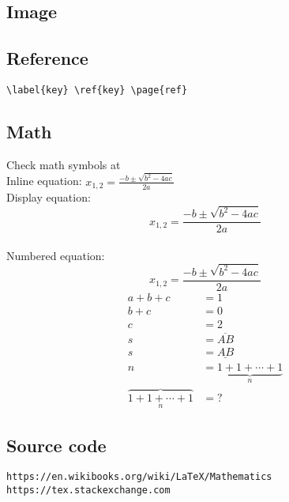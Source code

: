 \documentclass{article}
\newcommand{\site}[2][protocol]{\texttt{#1://#2}}
\begin{document}
\subsection{Image}
\subsection{Reference}
\verb|\label{key} \ref{key} \page{ref}|

\subsection{Math}
Check math symbols at \cite{R01}
\\Inline equation:
\( x_{1,2} = \frac{-b \pm \sqrt{b^2-4ac}}{2a} \)
\\Display equation:
\[ x_{1,2} = \frac{-b \pm \sqrt{b^2-4ac}}{2a} \]
\\Numbered equation:
\begin{equation}
x_{1,2} = \frac{-b \pm \sqrt{b^2-4ac}}{2a}
\end{equation}
\begin{align*}
  a + b + c &= 1\\
  b + c &= 0\\
  c &= 2\\
  s &= \overline{AB}\\
  s &= \underline{AB}\\
  n &= \underbrace{1+1+\cdots+1}_n\\
  \overbrace{1+1+\cdots+1}_n &= ?
\end{align*}

\subsection{Source code}

\begin{thebibliography}{widest label}
   \site[https]{en.wikibooks.org/wiki/LaTeX/Mathematics}
   \site[https]{tex.stackexchange.com}
\end{thebibliography}
\end{document}
